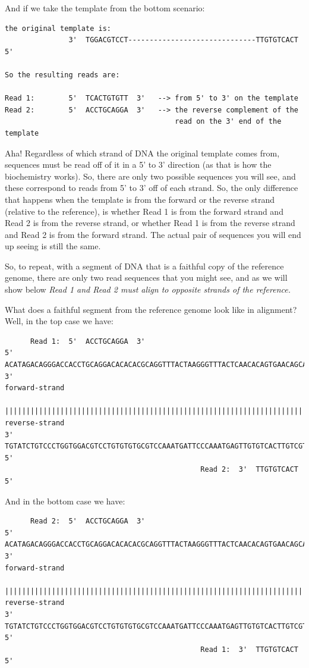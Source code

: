 \documentclass[]{krantz}
\begin{document}
And if we take the template from the bottom scenario:

\begin{verbatim}
the original template is:
               3'  TGGACGTCCT------------------------------TTGTGTCACT  5'
               
So the resulting reads are:

Read 1:        5'  TCACTGTGTT  3'   --> from 5' to 3' on the template
Read 2:        5'  ACCTGCAGGA  3'   --> the reverse complement of the
                                        read on the 3' end of the template
\end{verbatim}

Aha! Regardless of which strand of DNA the original template
comes from, sequences must be read off of it in a 5' to 3' direction
(as that is how the biochemistry works). So, there are only two
possible sequences you will see, and these correspond to reads from 5' to 3'
off of each strand. So, the only difference that happens when
the template is from the forward or the reverse strand (relative to the
reference), is whether Read 1 is from the forward strand and Read 2 is
from the reverse strand, or whether Read 1 is from the reverse strand
and Read 2 is from the forward strand. The actual pair of sequences
you will end up seeing is still the same.

So, to repeat, with a segment of DNA that is a faithful copy of the reference genome,
there are only two read sequences that you might see, and as we will show
below \emph{Read 1 and Read 2 must
align to opposite strands of the reference.}

What does a faithful segment from the reference genome look like
in alignment? Well, in the top case we have:

\begin{verbatim}
      Read 1:  5'  ACCTGCAGGA  3' 
5'  ACATAGACAGGGACCACCTGCAGGACACACACGCAGGTTTACTAAGGGTTTACTCAACACAGTGAACAGCATATACCAGA  3'
forward-strand
    ||||||||||||||||||||||||||||||||||||||||||||||||||||||||||||||||||||||||||||||||
reverse-strand
3'  TGTATCTGTCCCTGGTGGACGTCCTGTGTGTGCGTCCAAATGATTCCCAAATGAGTTGTGTCACTTGTCGTATATGGTCT  5'  
                                              Read 2:  3'  TTGTGTCACT  5'
\end{verbatim}

And in the bottom case we have:

\begin{verbatim}
      Read 2:  5'  ACCTGCAGGA  3' 
5'  ACATAGACAGGGACCACCTGCAGGACACACACGCAGGTTTACTAAGGGTTTACTCAACACAGTGAACAGCATATACCAGA  3'  
forward-strand
    ||||||||||||||||||||||||||||||||||||||||||||||||||||||||||||||||||||||||||||||||
reverse-strand
3'  TGTATCTGTCCCTGGTGGACGTCCTGTGTGTGCGTCCAAATGATTCCCAAATGAGTTGTGTCACTTGTCGTATATGGTCT  5'
                                              Read 1:  3'  TTGTGTCACT  5'
\end{verbatim}
\end{document}
